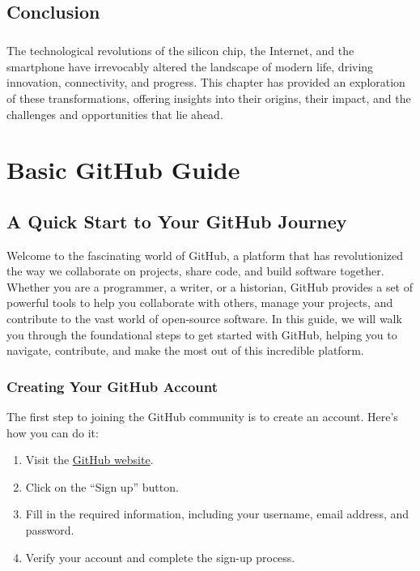 \documentclass[a4paper,12pt]{book}
\begin{document}
\section*{Conclusion}
\paragraph{}
The technological revolutions of the silicon chip, the Internet, and the smartphone have irrevocably altered the landscape of modern life, driving innovation, connectivity, and progress. This chapter has provided an exploration of these transformations, offering insights into their origins, their impact, and the challenges and opportunities that lie ahead.



\clearpage
{}
\appendix
\renewcommand{\thechapter}{\Roman{chapter}} %

\chapter{Basic GitHub Guide}
\section*{A Quick Start to Your GitHub Journey}

Welcome to the fascinating world of GitHub, a platform that has revolutionized the way we collaborate on projects, share code, and build software together. Whether you are a programmer, a writer, or a historian, GitHub provides a set of powerful tools to help you collaborate with others, manage your projects, and contribute to the vast world of open-source software. In this guide, we will walk you through the foundational steps to get started with GitHub, helping you to navigate, contribute, and make the most out of this incredible platform.

\subsection*{Creating Your GitHub Account}

The first step to joining the GitHub community is to create an account. Here’s how you can do it:

\begin{enumerate}
    \item Visit the \href{https://github.com/}{GitHub website}.
    \item Click on the “Sign up” button.
    \item Fill in the required information, including your username, email address, and password.
    \item Verify your account and complete the sign-up process.
\end{enumerate}
\end{document}

